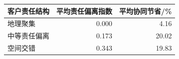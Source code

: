 \begin{tabular*}{0.76\linewidth}{@{\extracolsep{\fill}}lrr@{}}
\toprule
客户责任结构 & 平均责任偏离指数 & 平均协同节省/\% \\
\midrule
地理聚集 & 0.000 & 4.16 \\
中等责任偏离 & 0.173 & 20.02 \\
空间交错 & 0.343 & 19.83 \\
\bottomrule
\end{tabular*}
